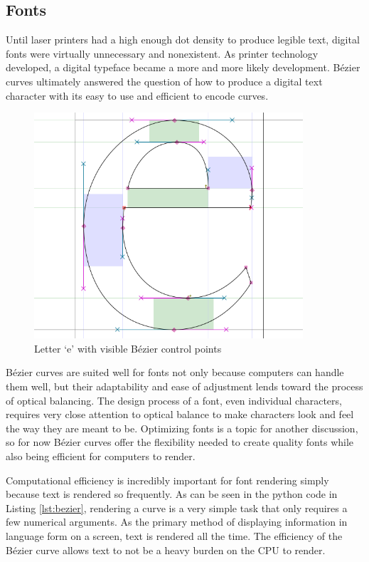 \documentclass[12pt,letterpaper]{article}
\begin{document}
\subsection{Fonts}

Until laser printers had a high enough dot density to produce legible text, digital fonts were virtually unnecessary and nonexistent. As printer technology developed, a digital typeface became a more and more likely development. B\'ezier curves ultimately answered the question of how to produce a digital text character with its easy to use and efficient to encode curves.

\begin{figure}[H]
    \centering
    \includegraphics[width=10cm]{char}
    \caption{Letter `e' with visible B\'ezier control points \citep[9]{fontforge}}
\end{figure}

B\'ezier curves are suited well for fonts not only because computers can handle them well, but their adaptability and ease of adjustment lends toward the process of optical balancing. The design process of a font, even individual characters, requires very close attention to optical balance to make characters look and feel the way they are meant to be. Optimizing fonts is a topic for another discussion, so for now B\'ezier curves offer the flexibility needed to create quality fonts while also being efficient for computers to render. 

Computational efficiency is incredibly important for font rendering simply because text is rendered so frequently. As can be seen in the python code in Listing \ref{lst:bezier}, rendering a curve is a very simple task that only requires a few numerical arguments. As the primary method of displaying information in language form on a screen, text is rendered all the time. The efficiency of the B\'ezier curve allows text to not be a heavy burden on the CPU to render. 
\end{document}
